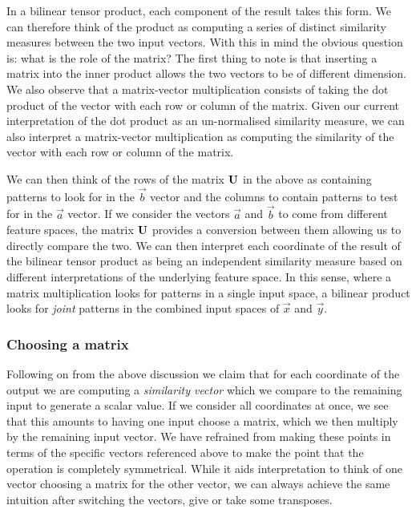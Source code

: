 In a bilinear tensor product, each component of the result takes this form.
We can therefore think of the
product as computing a series of distinct similarity measures between the two input
vectors. With this in mind the obvious question is: what is the role of the matrix? The first
thing to note is that inserting a matrix into the inner product allows the two vectors to be
of different dimension. We also observe that a matrix-vector multiplication consists of
taking the dot product of the vector with each row or column of the matrix. Given our current
interpretation of the dot product as an un-normalised similarity measure, we can also
interpret a matrix-vector multiplication as computing the similarity of the vector with each
row or column of the matrix. 

We can then think of the rows of the matrix \(\mathbf{U}\) in the
above as containing patterns to look for in the \(\vec{b}\) vector and the columns to
contain patterns to test for in the \(\vec{a}\) vector. If we consider the vectors 
\(\vec{a}\) and \(\vec{b}\) to come from different feature spaces, the matrix \(\mathbf{U}\)
provides a conversion between them allowing us to directly compare the two. We can then
interpret each coordinate of the result of the bilinear tensor product as being an
independent similarity measure based on different interpretations of the underlying
feature space. In this sense, where a matrix multiplication looks for patterns in a single input
space, a bilinear product looks for \emph{joint} patterns in the combined input spaces of
\(\vec{x}\) and \(\vec{y}\).


\subsubsection{Choosing a matrix}
Following on from the above discussion we claim that for each coordinate of the output we are
computing a \emph{similarity vector} which we compare to the remaining input to generate a
scalar value. If we consider all coordinates at once, we see that this amounts to having
one input choose a matrix, which we then multiply by the remaining input vector. We have
refrained from making these points in terms of the specific vectors referenced above to make
the point that the operation is completely symmetrical. While it aids interpretation to think
of one vector choosing a matrix for the other vector, we can always achieve the same
intuition after switching the vectors, give or take some transposes.

